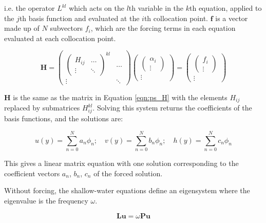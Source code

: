 i.e. the operator $L^{kl}$ which acts on the $l$th variable in the $k$th equation, applied to the $j$th basis function and evaluated at the $i$th collocation point. $\textbf{f}$ is a vector made up of $N$ subvectors $f_{i}$, which are the forcing terms in each equation evaluated at each collocation point.

\begin{equation}
    \textbf{H} =
  \begin{pmatrix}
    \begin{pmatrix}
H_{ij} & \dots \\
\vdots & \ddots
    \end{pmatrix}^{kl} & \dots \\
  \vdots & \ddots
  \end{pmatrix}
  \begin{pmatrix}
    \begin{pmatrix}
    \alpha_{i} \\
    \vdots
    \end{pmatrix} \\
  \vdots
  \end{pmatrix}
  =
  \begin{pmatrix}
    \begin{pmatrix}
    f_{i} \\
    \vdots
    \end{pmatrix} \\
  \vdots
  \end{pmatrix}
\end{equation}

$\textbf{H}$ is the same as the matrix in Equation \ref{eqn:ps_H} with the elements $H_{ij}$ replaced by submatrices $H^{kl}_{ij}$. Solving this system returns the coefficients of the basis functions, and the solutions are:

\begin{equation}\label{eqn:ps-coeff-solutions}
 u(y) = \sum_{n=0}^{N} a_{n} \phi_{n}
; \quad
 v(y) = \sum_{n=0}^{N} b_{n} \phi_{n}
; \quad
 h(y) = \sum_{n=0}^{N} c_{n} \phi_{n}
\end{equation}


This gives a linear matrix equation with one solution corresponding to the coefficient vectors $a_{n}$, $b_{n}$, $c_{n}$ of the forced solution.

Without forcing, the shallow-water equations define an eigensystem where the eigenvalue is the frequency $\omega$.

\begin{equation}
  \textbf{L} \textbf{u} = \omega \textbf{P} \textbf{u}
\end{equation}

